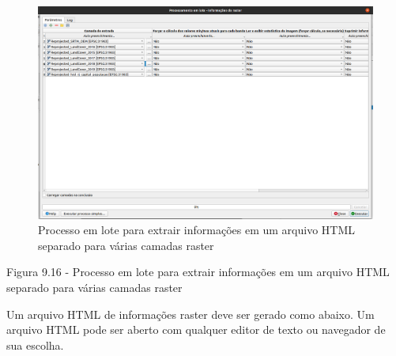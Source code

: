 \documentclass[
  portuguese,
]{krantz}
\begin{document}
\begin{figure}
\centering
\includegraphics{media/modulo9/fig916.png}
\caption{Processo em lote para extrair informações em um arquivo HTML separado para várias camadas raster}
\end{figure}

Figura 9.16 - Processo em lote para extrair informações em um arquivo HTML separado para várias camadas raster

Um arquivo HTML de informações raster deve ser gerado como abaixo. Um arquivo HTML pode ser aberto com qualquer editor de texto ou navegador de sua escolha.
\end{document}
